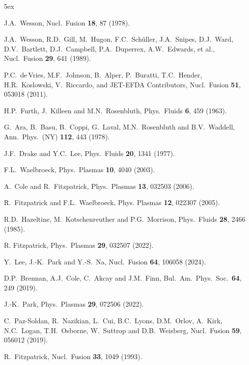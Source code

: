 \documentclass[12pt,prb,aps]{revtex4-1}
\begin{document}
\begin{thebibliography}{99}\baselineskip 5ex

 J.A.~Wesson, Nucl.\ Fusion {\bf 18}, 87 (1978).

 J.A.~Wesson, R.D.~Gill, M.~Hugon, F.C.~Sch\"{u}ller, J.A.~Snipes, D.J.~Ward, D.V.~Bartlett, 
D.J.~Campbell, P.A.~Duperrex, A.W.~Edwards, et al., Nucl.\ Fusion {\bf 29}, 641 (1989).

 P.C.~de\,Vries, M.F.~Johnson, B.~Alper, P.~Buratti, T.C.~Hender, H.R.~Koslowski, V.~Riccardo, and JET-EFDA Contributors, Nucl.\ Fusion {\bf 51}, 053018 (2011).

 H.P.~Furth, J.~Killeen and M.N.~Rosenbluth, Phys.\ Fluids {\bf 6}, 459 (1963).

 G.~Ara, B.~Basu, B.~Coppi, G.~Laval, M.N.~Rosenbluth and B.V.~Waddell, Ann.\ Phys.\ (NY) {\bf 112}, 443 (1978).

 J.F.~Drake and Y.C.~Lee, Phys.\ Fluids {\bf 20}, 1341 (1977).

 F.L.~Waelbroeck, Phys.\ Plasmas {\bf 10}, 4040 (2003).

 A.~Cole and R.~Fitzpatrick, Phys.\ Plasmas {\bf 13}, 032503 (2006).

 R.~Fitzpatrick and F.L.~Waelbroeck, Phys. Plasmas {\bf 12}, 022307 (2005).

 R.D.~Hazeltine, M.~Kotschenreuther and P.G.~Morrison, Phys.\ Fluids {\bf 28}, 2466 (1985).

 R. Fitzpatrick,  Phys.\ Plasmas {\bf 29}, 032507 (2022).

 Y.~Lee, J.-K.~Park and Y.-S.~Na, Nucl.\ Fusion {\bf 64}, 106058 (2024).

 D.P.~Brennan, A.J.~Cole, C.~Akcay and J.M.~Finn, Bul.\ Am.\ Phys.\ Soc.\ {\bf 64}, 249 (2019).

 J.-K.~Park, Phys.\ Plasmas {\bf 29}, 072506 (2022).

 C.~Paz-Soldan, R.~Nazikian, L.~Cui, B.C.~Lyons, D.M.~Orlov, A.~Kirk, 
N.C.~Logan, T.H.~Osborne, W.~Suttrop and D.B.~Weisberg, Nucl.\ Fusion {\bf 59},
056012 (2019).

 R.~Fitzpatrick, Nucl.\ Fusion {\bf 33}, 1049 (1993).

\end{thebibliography}
\end{document}
